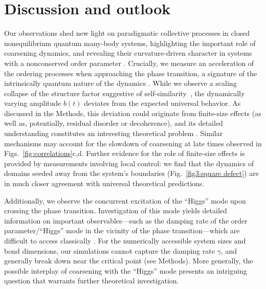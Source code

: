 \documentclass[reprint,twocolumn,secnumarabic,amssymb, aps, prx]{revtex4-2}
\begin{document}
\section*{}


\section*{Discussion and outlook}
\label{sec:outlook}
Our observations shed new light on paradigmatic collective processes in closed nonequilibrium quantum many-body systems,
highlighting the important role of coarsening dynamics, and revealing their curvature-driven character in systems with a nonconserved order parameter \cite{Bray1994,Samajdar2024}. Crucially, we measure an acceleration of the ordering processes when approaching the phase transition, a signature of the intrinsically quantum nature of the dynamics \cite{Samajdar2024}. While we observe a scaling collapse of the structure factor suggestive of self-similarity~\cite{Bray1994}, the dynamically varying amplitude $b(t)$ deviates from the expected universal behavior. As discussed in the Methods, this deviation could originate from finite-size effects (as well as, potentially,  residual disorder or decoherence), and its detailed understanding constitutes  an interesting theoretical problem \cite{barenblatt1996scaling}. Similar mechanisms may account for the slowdown of coarsening at late times observed in Figs.~\ref{fig:correlations}c,d.  Further evidence for the role of finite-size effects is provided by measurements involving local control: we find that the dynamics of domains seeded away from the system's boundaries (Fig.~\ref{fig3:square defect}) are in much closer agreement with  universal theoretical predictions. 

Additionally, we observe the concurrent excitation of the ``Higgs'' mode upon crossing the phase transition. Investigation of this mode yields detailed information on important observables---such as the damping rate of the order parameter/``Higgs'' mode in the vicinity of the phase transition---which are difficult to access classically \cite{sachdev1997theory}. For the numerically accessible system sizes and bond dimensions, our simulations cannot capture the damping rate $\gamma$, and generally break down near the critical point (see Methods). More generally, the possible interplay of coarsening with the ``Higgs'' mode presents an intriguing question that warrants further theoretical investigation. 
\end{document}
